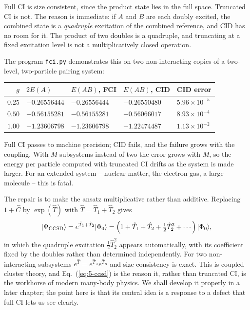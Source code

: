 Full CI is size consistent, since the product state lies in the full space.
Truncated CI is not.  The reason is immediate: if $A$ and $B$ are each doubly
excited, the combined state is a \emph{quadruple} excitation of the combined
reference, and CID has no room for it.  The product of two doubles is a
quadruple, and truncating at a fixed excitation level is not a
multiplicatively closed operation.

The program \texttt{fci.py} demonstrates this on two non-interacting copies of
a two-level, two-particle pairing system:
\begin{center}
\renewcommand{\arraystretch}{1.2}
\begin{tabular}{rllll}
\toprule
$g$ & $2E(A)$ & $E(AB)$, FCI & $E(AB)$, CID & CID error\\
\midrule
$0.25$ & $-0.26556444$ & $-0.26556444$ & $-0.26550480$ & $5.96\times10^{-5}$\\
$0.50$ & $-0.56155281$ & $-0.56155281$ & $-0.56066017$ & $8.93\times10^{-4}$\\
$1.00$ & $-1.23606798$ & $-1.23606798$ & $-1.22474487$ & $1.13\times10^{-2}$\\
\bottomrule
\end{tabular}
\end{center}
Full CI passes to machine precision; CID fails, and the failure grows with the
coupling.  With $M$ subsystems instead of two the error grows with $M$, so the
energy per particle computed with truncated CI drifts as the system is made
larger.  For an extended system -- nuclear matter, the electron gas, a large
molecule -- this is fatal.

The repair is to make the ansatz multiplicative rather than additive.
Replacing $1+\hat{C}$ by $\exp(\hat{T})$ with $\hat{T}=\hat{T}_1+\hat{T}_2$
gives
\begin{equation}
  \vert \Psi_{\mathrm{CCSD}} \rangle = e^{\hat{T}_1+\hat{T}_2}\vert \Phi_0 \rangle
  = \left(1+\hat{T}_1+\hat{T}_2
    + \tfrac{1}{2}\hat{T}_2^2 + \cdots\right)\vert \Phi_0 \rangle,
  \label{eq:5-ccsd}
\end{equation}
in which the quadruple excitation $\tfrac12\hat{T}_2^2$ appears automatically,
with its coefficient fixed by the doubles rather than determined
independently.  For two non-interacting subsystems
$e^{\hat{T}}=e^{\hat{T}_A}e^{\hat{T}_B}$ and size consistency is exact.  This
is coupled-cluster theory, and Eq.~(\ref{eq:5-ccsd}) is the reason it, rather
than truncated CI, is the workhorse of modern many-body physics.  We shall
develop it properly in a later chapter; the point here is that its central
idea is a response to a defect that full CI lets us see clearly.

